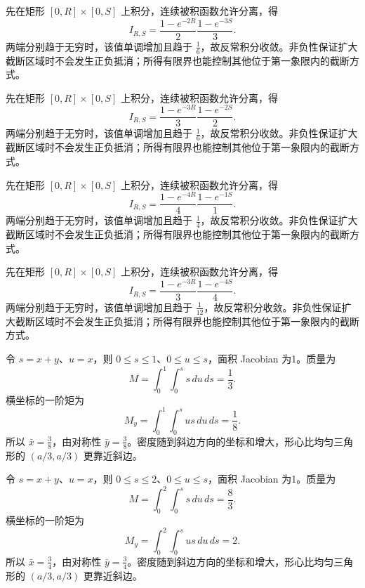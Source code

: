 \documentclass[UTF8,12pt,a4paper,fontset=fandol]{ctexart}
\begin{document}
\begin{solve}\label{ans:c40q3}
先在矩形 $[0,R]\times[0,S]$ 上积分，连续被积函数允许分离，得
\[
I_{R,S}=\frac{1-e^{-2R}}{2}\frac{1-e^{-3S}}{3}.
\]
两端分别趋于无穷时，该值单调增加且趋于 $\frac{1}{6}$，故反常积分收敛。非负性保证扩大截断区域时不会发生正负抵消；所得有限界也能控制其他位于第一象限内的截断方式。
\end{solve}

\begin{solve}\label{ans:c40q4}
先在矩形 $[0,R]\times[0,S]$ 上积分，连续被积函数允许分离，得
\[
I_{R,S}=\frac{1-e^{-3R}}{3}\frac{1-e^{-2S}}{2}.
\]
两端分别趋于无穷时，该值单调增加且趋于 $\frac{1}{6}$，故反常积分收敛。非负性保证扩大截断区域时不会发生正负抵消；所得有限界也能控制其他位于第一象限内的截断方式。
\end{solve}

\begin{solve}\label{ans:c40q5}
先在矩形 $[0,R]\times[0,S]$ 上积分，连续被积函数允许分离，得
\[
I_{R,S}=\frac{1-e^{-4R}}{4}\frac{1-e^{-1S}}{1}.
\]
两端分别趋于无穷时，该值单调增加且趋于 $\frac{1}{4}$，故反常积分收敛。非负性保证扩大截断区域时不会发生正负抵消；所得有限界也能控制其他位于第一象限内的截断方式。
\end{solve}

\begin{solve}\label{ans:c40q6}
先在矩形 $[0,R]\times[0,S]$ 上积分，连续被积函数允许分离，得
\[
I_{R,S}=\frac{1-e^{-3R}}{3}\frac{1-e^{-4S}}{4}.
\]
两端分别趋于无穷时，该值单调增加且趋于 $\frac{1}{12}$，故反常积分收敛。非负性保证扩大截断区域时不会发生正负抵消；所得有限界也能控制其他位于第一象限内的截断方式。
\end{solve}

\begin{solve}\label{ans:c40q7}
令 $s=x+y$、$u=x$，则 $0\le s\le 1$、$0\le u\le s$，面积 Jacobian 为1。质量为
\[
M=\int_0^{1}\int_0^s s\,du\,ds=\frac{1}{3}.
\]
横坐标的一阶矩为
\[
M_y=\int_0^{1}\int_0^s us\,du\,ds=\frac{1}{8}.
\]
所以 $\bar x=\frac{3}{8}$，由对称性 $\bar y=\frac{3}{8}$。密度随到斜边方向的坐标和增大，形心比均匀三角形的 $(a/3,a/3)$ 更靠近斜边。
\end{solve}

\begin{solve}\label{ans:c40q8}
令 $s=x+y$、$u=x$，则 $0\le s\le 2$、$0\le u\le s$，面积 Jacobian 为1。质量为
\[
M=\int_0^{2}\int_0^s s\,du\,ds=\frac{8}{3}.
\]
横坐标的一阶矩为
\[
M_y=\int_0^{2}\int_0^s us\,du\,ds=2.
\]
所以 $\bar x=\frac{3}{4}$，由对称性 $\bar y=\frac{3}{4}$。密度随到斜边方向的坐标和增大，形心比均匀三角形的 $(a/3,a/3)$ 更靠近斜边。
\end{solve}
\end{document}
